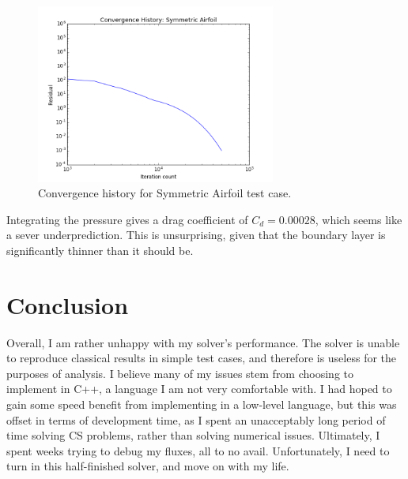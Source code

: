 \documentclass{article}
\begin{document}
\begin{figure}[!ht]
\centering
\includegraphics[width=0.7\textwidth]{images/airfoil_convergence.png}
\caption{Convergence history for Symmetric Airfoil test case.}
\label{fig:airfoil_convergence}
\end{figure}

Integrating the pressure gives a drag coefficient of $C_d = 0.00028$, which seems like a sever underprediction. This is unsurprising, given that the boundary layer is significantly thinner than it should be.

\newpage
\section{Conclusion}
Overall, I am rather unhappy with my solver's performance. The solver is unable to reproduce classical results in simple test cases, and therefore is useless for the purposes of analysis. I believe many of my issues stem from choosing to implement in C++, a language I am not very comfortable with. I had hoped to gain some speed benefit from implementing in a low-level language, but this was offset in terms of development time, as I spent an unacceptably long period of time solving CS problems, rather than solving numerical issues. Ultimately, I spent weeks trying to debug my fluxes, all to no avail. Unfortunately, I need to turn in this half-finished solver, and move on with my life.
\end{document}
